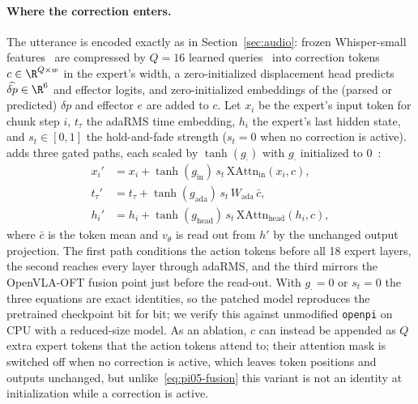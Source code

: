\paragraph{Where the correction enters.}
The utterance is encoded exactly as in Section~\ref{sec:audio}: frozen Whisper-small features~\citep{radford2023whisper} are compressed by $Q{=}16$ learned queries~\citep{jaegle2021perceiver} into correction tokens $c\in\R^{Q\times w}$ in the expert's width, a zero-initialized displacement head predicts $\widehat{\delta p}\in\R^6$ and effector logits, and zero-initialized embeddings of the (parsed or predicted) $\delta p$ and effector $e$ are added to $c$. Let $x_i$ be the expert's input token for chunk step $i$, $t_\tau$ the adaRMS time embedding, $h_i$ the expert's last hidden state, and $s_t\in[0,1]$ the hold-and-fade strength ($s_t{=}0$ when no correction is active). \meci adds three gated paths, each scaled by $\tanh(g_\cdot)$ with $g_\cdot$ initialized to $0$~\citep{alayrac2022flamingo,zhang2023controlnet}:
\begin{equation}
\begin{aligned}
  x_i' &= x_i + \tanh(g_{\mathrm{in}})\, s_t\, \mathrm{XAttn}_{\mathrm{in}}(x_i, c),\\
  t_\tau' &= t_\tau + \tanh(g_{\mathrm{ada}})\, s_t\, W_{\mathrm{ada}}\,\bar c,\\
  h_i' &= h_i + \tanh(g_{\mathrm{head}})\, s_t\, \mathrm{XAttn}_{\mathrm{head}}(h_i, c),
\end{aligned}
\label{eq:pi05-fusion}
\end{equation}
where $\bar c$ is the token mean and $v_\theta$ is read out from $h'$ by the unchanged output projection. The first path conditions the action tokens before all 18 expert layers, the second reaches every layer through adaRMS, and the third mirrors the OpenVLA-OFT fusion point just before the read-out. With $g_\cdot{=}0$ or $s_t{=}0$ the three equations are exact identities, so the patched model reproduces the pretrained checkpoint bit for bit; we verify this against unmodified \texttt{openpi} on CPU with a reduced-size model. As an ablation, $c$ can instead be appended as $Q$ extra expert tokens that the action tokens attend to; their attention mask is switched off when no correction is active, which leaves token positions and outputs unchanged, but unlike~\eqref{eq:pi05-fusion} this variant is not an identity at initialization while a correction is active.

